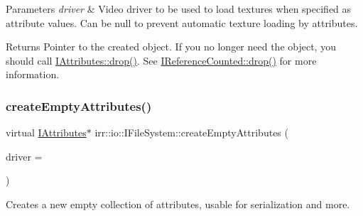 \begin{DoxyParams}{Parameters}
{\em driver} & Video driver to be used to load textures when specified as attribute values. Can be null to prevent automatic texture loading by attributes. \\
\hline
\end{DoxyParams}
\begin{DoxyReturn}{Returns}
Pointer to the created object. If you no longer need the object, you should call \hyperlink{classirr_1_1IReferenceCounted_a03856a09355b89d178090c4a5f738543}{I\+Attributes\+::drop()}. See \hyperlink{classirr_1_1IReferenceCounted_a03856a09355b89d178090c4a5f738543}{I\+Reference\+Counted\+::drop()} for more information. 
\end{DoxyReturn}
\mbox{\label{classirr_1_1io_1_1IFileSystem_a50f91cd88b926751367dac153c1cefd2}} 
\subsubsection{\texorpdfstring{create\+Empty\+Attributes()}{createEmptyAttributes()}\hspace{0.1cm}{\footnotesize\ttfamily [2/2]}}
{\footnotesize\ttfamily virtual \hyperlink{classirr_1_1io_1_1IAttributes}{I\+Attributes}$\ast$ irr\+::io\+::\+I\+File\+System\+::create\+Empty\+Attributes (\begin{DoxyParamCaption}\item[{\hyperlink{classirr_1_1video_1_1IVideoDriver}{video\+::\+I\+Video\+Driver} $\ast$}]{driver = {} }\end{DoxyParamCaption})\hspace{0.3cm}{\ttfamily [pure virtual]}}



Creates a new empty collection of attributes, usable for serialization and more. 


